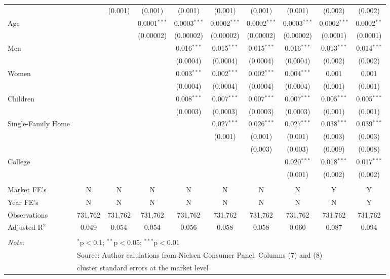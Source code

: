 \begin{table}[!htbp]
{\begin{tabular}{@{\extracolsep{5pt}}lccccccccc}
  &  & (0.001) & (0.001) & (0.001) & (0.001) & (0.001) & (0.001) & (0.002) & (0.002) \\
  Age &  &  & 0.0001$^{***}$ & 0.0003$^{***}$ & 0.0002$^{***}$ & 0.0002$^{***}$ & 0.0003$^{***}$ & 0.0002$^{***}$ & 0.0002$^{**}$ \\
  &  &  & (0.00002) & (0.00002) & (0.00002) & (0.00002) & (0.00002) & (0.0001) & (0.0001) \\
  Men &  &  &  & 0.016$^{***}$ & 0.015$^{***}$ & 0.015$^{***}$ & 0.016$^{***}$ & 0.013$^{***}$ & 0.014$^{***}$ \\
  &  &  &  & (0.0004) & (0.0004) & (0.0004) & (0.0004) & (0.002) & (0.002) \\
  Women &  &  &  & 0.003$^{***}$ & 0.002$^{***}$ & 0.002$^{***}$ & 0.004$^{***}$ & 0.001 & 0.001 \\
  &  &  &  & (0.0004) & (0.0004) & (0.0004) & (0.0004) & (0.001) & (0.001) \\
  Children &  &  &  & 0.008$^{***}$ & 0.007$^{***}$ & 0.007$^{***}$ & 0.007$^{***}$ & 0.005$^{***}$ & 0.005$^{***}$ \\
  &  &  &  & (0.0003) & (0.0003) & (0.0003) & (0.0003) & (0.001) & (0.001) \\
  Single-Family Home &  &  &  &  & 0.027$^{***}$ & 0.026$^{***}$ & 0.027$^{***}$ & 0.038$^{***}$ & 0.039$^{***}$ \\
  &  &  &  &  & (0.001) & (0.001) & (0.001) & (0.003) & (0.003) \\
  &  &  &  &  &  & (0.003) & (0.003) & (0.009) & (0.008) \\
  College &  &  &  &  &  &  & 0.020$^{***}$ & 0.018$^{***}$ & 0.017$^{***}$ \\
  &  &  &  &  &  &  & (0.001) & (0.002) & (0.002) \\
 \hline \\[-1.8ex]
Market FE's & N & N & N & N & N & N & N & Y & Y \\
Year FE's & N & N & N & N & N & N & N & N & Y \\
Observations & 731,762 & 731,762 & 731,762 & 731,762 & 731,762 & 731,762 & 731,762 & 731,762 & 731,762 \\
Adjusted R$^{2}$ & 0.049 & 0.054 & 0.054 & 0.056 & 0.058 & 0.058 & 0.060 & 0.087 & 0.094 \\
\hline
\hline \\[-1.8ex]
\textit{Note:}  & \multicolumn{9}{l}{$^{*}$p$<$0.1; $^{**}$p$<$0.05; $^{***}$p$<$0.01} \\
 & \multicolumn{9}{l}{Source: Author calulations from Nielsen Consumer Panel. Columns (7) and (8) } \\
 & \multicolumn{9}{l}{cluster standard errors at the market level} \\
\end{tabular}
}
\end{table}
